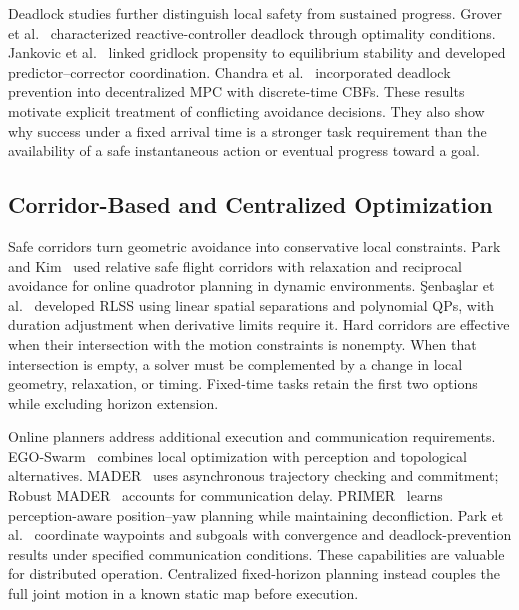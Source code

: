 Deadlock studies further distinguish local safety from sustained progress. Grover et al.~\cite{grover2023} characterized reactive-controller deadlock through optimality conditions. Jankovic et al.~\cite{jankovic2024} linked gridlock propensity to equilibrium stability and developed predictor--corrector coordination. Chandra et al.~\cite{chandra2025} incorporated deadlock prevention into decentralized MPC with discrete-time CBFs. These results motivate explicit treatment of conflicting avoidance decisions. They also show why success under a fixed arrival time is a stronger task requirement than the availability of a safe instantaneous action or eventual progress toward a goal.

\subsection{Corridor-Based and Centralized Optimization}
Safe corridors turn geometric avoidance into conservative local constraints. Park and Kim~\cite{park2021} used relative safe flight corridors with relaxation and reciprocal avoidance for online quadrotor planning in dynamic environments. \c{S}enba\c{s}lar et al.~\cite{senbaslar2023} developed RLSS using linear spatial separations and polynomial QPs, with duration adjustment when derivative limits require it. Hard corridors are effective when their intersection with the motion constraints is nonempty. When that intersection is empty, a solver must be complemented by a change in local geometry, relaxation, or timing. Fixed-time tasks retain the first two options while excluding horizon extension.

Online planners address additional execution and communication requirements. EGO-Swarm~\cite{zhou2021ego} combines local optimization with perception and topological alternatives. MADER~\cite{tordesillas2022} uses asynchronous trajectory checking and commitment; Robust MADER~\cite{kondo2024} accounts for communication delay. PRIMER~\cite{kondo2025} learns perception-aware position--yaw planning while maintaining deconfliction. Park et al.~\cite{park2025} coordinate waypoints and subgoals with convergence and deadlock-prevention results under specified communication conditions. These capabilities are valuable for distributed operation. Centralized fixed-horizon planning instead couples the full joint motion in a known static map before execution.

